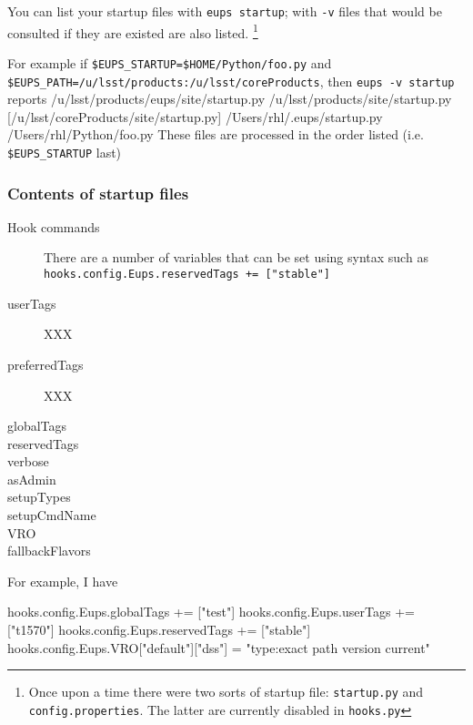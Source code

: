 \documentclass{article}
\newcommand{\code}[1]{\texttt{#1}}
\newcommand{\file}[1]{\texttt{#1}}
\let\overbatim=\verbatim
\let\oendverbatim=\endverbatim
\renewenvironment{verbatim}
{\center\minipage{16cm}\overbatim}
{\oendverbatim\endminipage\endcenter}
\begin{document}
You can list your startup files with \code{eups startup}; with \code{-v} files that would be consulted if they
are existed are also listed.  \footnote{Once upon a time there were two sorts of startup file: \file{startup.py} and \file{config.properties}.  The latter are currently disabled in \file{hooks.py}}

For example if \code{\$EUPS\_STARTUP=\$HOME/Python/foo.py} and \code{\$EUPS\_PATH=/u/lsst/products:/u/lsst/coreProducts}, then \code{eups -v startup} reports
\begin{verbatim}
/u/lsst/products/eups/site/startup.py             
/u/lsst/products/site/startup.py
[/u/lsst/coreProducts/site/startup.py]
/Users/rhl/.eups/startup.py             
/Users/rhl/Python/foo.py                
\end{verbatim}
These files are processed in the order listed (i.e. \code{\$EUPS\_STARTUP} last)

\subsubsection{Contents of startup files}

\begin{description}
  \item[Hook commands]
    There are a number of variables that can be set using syntax such as\hfil\break
    \code{hooks.config.Eups.reservedTags += ["stable"]}

    \item[userTags]
      XXX
    \item[preferredTags]
      XXX
    \item[globalTags]
    \item[reservedTags]
    \item[verbose]
    \item[asAdmin]
    \item[setupTypes]
    \item[setupCmdName]
    \item[VRO]
    \item[fallbackFlavors]
\end{description}

For example, I have
\begin{verbatim}

hooks.config.Eups.globalTags += ["test"]
hooks.config.Eups.userTags += ["t1570"]
hooks.config.Eups.reservedTags += ["stable"]
hooks.config.Eups.VRO["default"]["dss"] = "type:exact path version current"
\end{verbatim}
\end{document}
